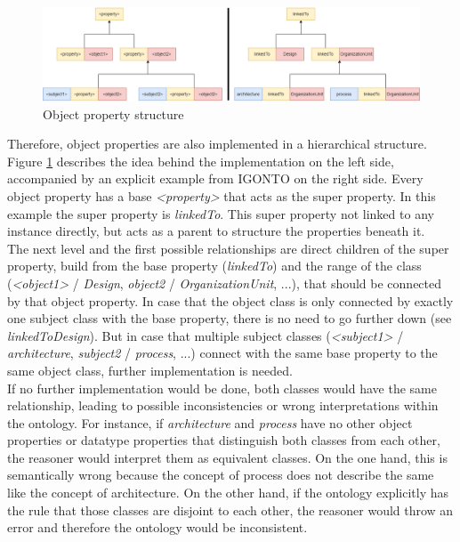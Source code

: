 \documentclass[
  a4paper,  %
  twoside,  %
  bibliography=totoc,
  headsepline,
  cleardoublepage=empty,
  parskip=half,
  draft=false
]{scrbook}
\begin{document}
\begin{figure}
  \centering
  \includegraphics[width=\textwidth]{graphics/object_property_hierarchy.png}
  \caption{Object property structure}
  \label{fig:object_property structure}
\end{figure}

Therefore, object properties are also implemented in a hierarchical structure. Figure \ref{fig:object_property structure} describes the idea behind the implementation on the left side, accompanied by an explicit example from IGONTO on the right side. Every object property has a base \textit{<property>} that acts as the super property. In this example the super property is \textit{linkedTo}. This super property not linked to any instance directly, but acts as a parent to structure the properties beneath it.\\
The next level and the first possible relationships are direct children of the super property, build from the base property (\textit{linkedTo}) and the range of the class (\textit{<object1>} / \textit{Design}, \textit{object2} / \textit{OrganizationUnit}, ...), that should be connected by that object property. In case that the object class is only connected by exactly one subject class with the base property, there is no need to go further down (see \textit{linkedToDesign}). But in case that multiple subject classes (\textit{<subject1>} / \textit{architecture}, \textit{subject2} / \textit{process}, ...) connect with the same base property to the same object class, further implementation is needed.\\
If no further implementation would be done, both classes would have the same relationship, leading to possible inconsistencies or wrong interpretations within the ontology. For instance, if \textit{architecture} and \textit{process} have no other object properties or datatype properties that distinguish both classes from each other, the reasoner would interpret them as equivalent classes. On the one hand, this is semantically wrong because the concept of process does not describe the same like the concept of architecture. On the other hand, if the ontology explicitly has the rule that those classes are disjoint to each other, the reasoner would throw an error and therefore the ontology would be inconsistent. \\
\end{document}
